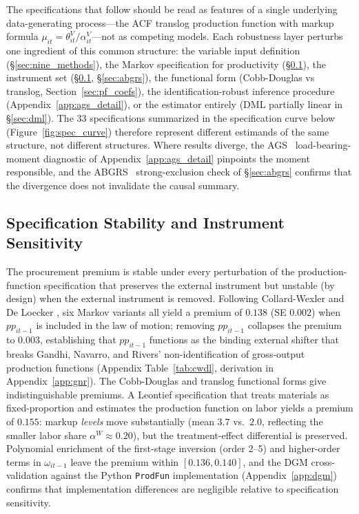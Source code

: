 \documentclass[11pt]{article}
\begin{document}
The specifications that follow should be read as features of a single underlying data-generating process---the ACF translog production function with markup formula $\mu_{it} = \theta^V_{it}/\alpha^V_{it}$---not as competing models. Each robustness layer perturbs one ingredient of this common structure: the variable input definition (\S\ref{sec:nine_methods}), the Markov specification for productivity (\S\ref{sec:specstab}), the instrument set (\S\ref{sec:specstab}, \S\ref{sec:abgrs}), the functional form (Cobb-Douglas vs translog, Section~\ref{sec:pf_coefs}), the identification-robust inference procedure (Appendix~\ref{app:ags_detail}), or the estimator entirely (DML partially linear in \S\ref{sec:dml}). The 33 specifications summarized in the specification curve below (Figure~\ref{fig:spec_curve}) therefore represent different estimands of the same structure, not different structures. Where results diverge, the AGS~\cite{AGS2017} load-bearing-moment diagnostic of Appendix~\ref{app:ags_detail} pinpoints the moment responsible, and the ABGRS~\cite{ABGRS2025} strong-exclusion check of \S\ref{sec:abgrs} confirms that the divergence does not invalidate the causal summary.

\subsection{Specification Stability and Instrument Sensitivity}\label{sec:specstab}

The procurement premium is stable under every perturbation of the production-function specification that preserves the external instrument but unstable (by design) when the external instrument is removed. Following Collard-Wexler and De Loecker \cite{CWDL2015}, six Markov variants all yield a premium of $0.138$ (SE $0.002$) when $pp_{it-1}$ is included in the law of motion; removing $pp_{it-1}$ collapses the premium to $0.003$, establishing that $pp_{it-1}$ functions as the binding external shifter that breaks Gandhi, Navarro, and Rivers' \cite{GNR2020} non-identification of gross-output production functions (Appendix Table~\ref{tab:cwdl}, derivation in Appendix~\ref{app:gnr}). The Cobb-Douglas and translog functional forms give indistinguishable premiums. A Leontief specification that treats materials as fixed-proportion and estimates the production function on labor yields a premium of $0.155$: markup \emph{levels} move substantially (mean $3.7$ vs.\ $2.0$, reflecting the smaller labor share $\alpha^W \approx 0.20$), but the treatment-effect differential is preserved. Polynomial enrichment of the first-stage inversion (order 2--5) and higher-order terms in $\omega_{it-1}$ leave the premium within $[0.136, 0.140]$, and the DGM cross-validation against the Python \texttt{ProdFun} implementation (Appendix~\ref{app:dgm}) confirms that implementation differences are negligible relative to specification sensitivity.
\end{document}
